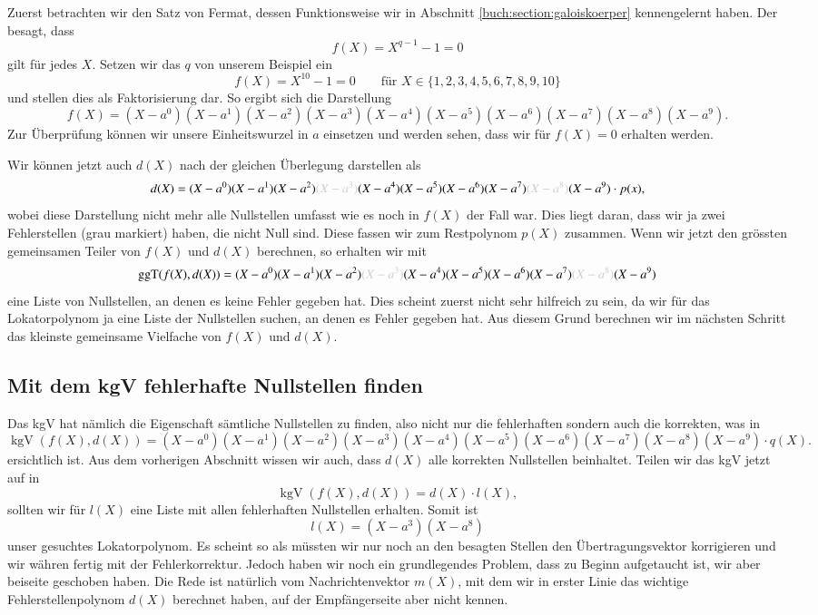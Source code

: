 Zuerst betrachten wir den Satz von Fermat, dessen Funktionsweise wir in Abschnitt \ref{buch:section:galoiskoerper} kennengelernt haben. Der besagt, dass
\[
f(X) = X^{q-1} -1 = 0
\] 
gilt für jedes $X$. Setzen wir das $q$ von unserem Beispiel ein
\[
f(X) = X^{10}-1 = 0 \qquad \text{für } X \in \{1,2,3,4,5,6,7,8,9,10\}
\]
und stellen dies als Faktorisierung dar. So ergibt sich die Darstellung 
\[
f(X) = (X-a^0)(X-a^1)(X-a^2)(X-a^3)(X-a^4)(X-a^5)(X-a^6)(X-a^7)(X-a^8)(X-a^9).
\]
Zur Überprüfung können wir unsere Einheitswurzel in $a$ einsetzen und werden sehen, dass wir für $f(X) = 0$ erhalten werden.

Wir können jetzt auch $d(X)$ nach der gleichen Überlegung darstellen als 
\[
d(X) = (X-a^0)(X-a^1)(X-a^2)\textcolor{gray!40}{(X-a^3)}(X-a^4)(X-a^5)(X-a^6)(X-a^7)\textcolor{gray!40}{(X-a^8)}(X-a^9) \cdot p(x),
\]
wobei diese Darstellung nicht mehr alle Nullstellen umfasst wie es noch in $f(X)$ der Fall war. 
Dies liegt daran, dass wir ja zwei Fehlerstellen (grau markiert) haben, die nicht Null sind. Diese fassen wir zum Restpolynom $p(X)$ zusammen.
Wenn wir jetzt den grössten gemeinsamen Teiler von $f(X)$ und $d(X)$ berechnen, so erhalten wir mit 
\[
\operatorname{ggT}(f(X),d(X)) = (X-a^0)(X-a^1)(X-a^2)\textcolor{gray!40}{(X-a^3)}(X-a^4)(X-a^5)(X-a^6)(X-a^7)\textcolor{gray!40}{(X-a^8)}(X-a^9)
\]
eine Liste von Nullstellen, an denen es keine Fehler gegeben hat.
Dies scheint zuerst nicht sehr hilfreich zu sein, da wir für das Lokatorpolynom ja eine Liste der Nullstellen suchen, an denen es Fehler gegeben hat. Aus diesem Grund berechnen wir im nächsten Schritt das kleinste gemeinsame Vielfache von $f(X)$ und $d(X)$. 


\subsection{Mit dem kgV fehlerhafte Nullstellen finden
	\label{reedsolomon:subsection:kgV}}

Das kgV hat nämlich die Eigenschaft sämtliche Nullstellen zu finden, also nicht nur die fehlerhaften sondern auch die korrekten, was in 
\[
\operatorname{kgV}(f(X),d(X)) = (X-a^0)(X-a^1)(X-a^2)(X-a^3)(X-a^4)(X-a^5)(X-a^6)(X-a^7)(X-a^8)(X-a^9) \cdot q(X).
\]
ersichtlich ist.
Aus dem vorherigen Abschnitt wissen wir auch, dass $d(X)$ alle korrekten Nullstellen beinhaltet. Teilen wir das kgV jetzt auf in 
\[
\operatorname{kgV}(f(X),d(X)) = d(X) \cdot l(X),
\]
sollten wir für $l(X)$ eine Liste mit allen fehlerhaften Nullstellen erhalten.
Somit ist 
\[
l(X) = (X-a^3)(X-a^8)
\]
unser gesuchtes Lokatorpolynom. 
Es scheint so als müssten wir nur noch an den besagten Stellen den Übertragungsvektor korrigieren und wir währen fertig mit der Fehlerkorrektur.
Jedoch haben wir noch ein grundlegendes Problem, dass zu Beginn aufgetaucht ist, wir aber beiseite geschoben haben. Die Rede ist natürlich vom Nachrichtenvektor $m(X)$, mit dem wir in erster Linie das wichtige Fehlerstellenpolynom $d(X)$ berechnet haben, auf der Empfängerseite aber nicht kennen.

